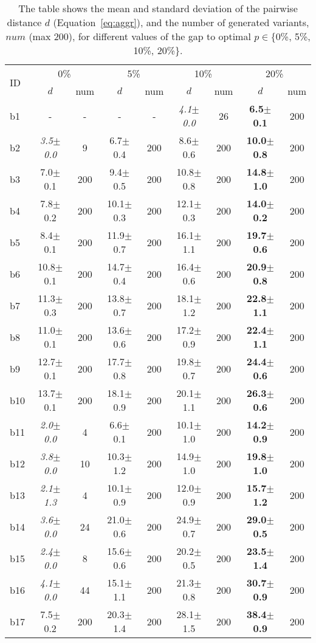 \begin{longtable}{|l|c|c|c|c|c|c|c|c|}
\caption{\label{tab:agaps} The table shows the mean and standard deviation of the pairwise distance 
			$d$ (Equation~\ref{eq:aggr}), and the number of generated variants, $num$ (max  200),
			for different values of the gap to optimal $p\in$\{0\%, 5\%, 10\%, 20\%\}.}\\
\hline
\multirow{2}{*}{ID}&\multicolumn{2}{c|}{0\%}&\multicolumn{2}{c|}{5\%}&\multicolumn{2}{c|}{10\%}&\multicolumn{2}{c|}{20\%}\\
\cline{2-9}
&$d$&num&$d$&num&$d$&num&$d$&num\\
\hline
b1&- & -&- & -&\textit{4.1$\pm$0.0} & 26&\textbf{6.5$\pm$0.1} & 200
\\
b2&\textit{3.5$\pm$0.0} & 9&6.7$\pm$0.4 & 200&8.6$\pm$0.6 & 200&\textbf{10.0$\pm$0.8} & 200
\\
b3&7.0$\pm$0.1 & 200&9.4$\pm$0.5 & 200&10.8$\pm$0.8 & 200&\textbf{14.8$\pm$1.0} & 200
\\
b4&7.8$\pm$0.2 & 200&10.1$\pm$0.3 & 200&12.1$\pm$0.3 & 200&\textbf{14.0$\pm$0.2} & 200
\\
b5&8.4$\pm$0.1 & 200&11.9$\pm$0.7 & 200&16.1$\pm$1.1 & 200&\textbf{19.7$\pm$0.6} & 200
\\
b6&10.8$\pm$0.1 & 200&14.7$\pm$0.4 & 200&16.4$\pm$0.6 & 200&\textbf{20.9$\pm$0.8} & 200
\\
b7&11.3$\pm$0.3 & 200&13.8$\pm$0.7 & 200&18.1$\pm$1.2 & 200&\textbf{22.8$\pm$1.1} & 200
\\
b8&11.0$\pm$0.1 & 200&13.6$\pm$0.6 & 200&17.2$\pm$0.9 & 200&\textbf{22.4$\pm$1.1} & 200
\\
b9&12.7$\pm$0.1 & 200&17.7$\pm$0.8 & 200&19.8$\pm$0.7 & 200&\textbf{24.4$\pm$0.6} & 200
\\
b10&13.7$\pm$0.1 & 200&18.1$\pm$0.9 & 200&20.1$\pm$1.1 & 200&\textbf{26.3$\pm$0.6} & 200
\\
b11&\textit{2.0$\pm$0.0} & 4&6.6$\pm$0.1 & 200&10.1$\pm$1.0 & 200&\textbf{14.2$\pm$0.9} & 200
\\
b12&\textit{3.8$\pm$0.0} & 10&10.3$\pm$1.2 & 200&14.9$\pm$1.0 & 200&\textbf{19.8$\pm$1.0} & 200
\\
b13&\textit{2.1$\pm$1.3} & 4&10.1$\pm$0.9 & 200&12.0$\pm$0.9 & 200&\textbf{15.7$\pm$1.2} & 200
\\
b14&\textit{3.6$\pm$0.0} & 24&21.0$\pm$0.6 & 200&24.9$\pm$0.7 & 200&\textbf{29.0$\pm$0.5} & 200
\\
b15&\textit{2.4$\pm$0.0} & 8&15.6$\pm$0.6 & 200&20.2$\pm$0.5 & 200&\textbf{23.5$\pm$1.4} & 200
\\
b16&\textit{4.1$\pm$0.0} & 44&15.1$\pm$1.1 & 200&21.3$\pm$0.8 & 200&\textbf{30.7$\pm$0.9} & 200
\\
b17&7.5$\pm$0.2 & 200&20.3$\pm$1.4 & 200&28.1$\pm$1.5 & 200&\textbf{38.4$\pm$0.9} & 200
\\
\hline
\end{longtable}
